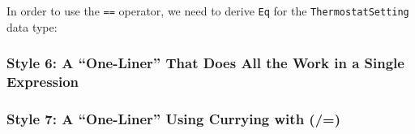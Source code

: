 In order to use the \texttt{==} operator, we need to derive \texttt{Eq}
for the \texttt{ThermostatSetting} data type:

\begin{Shaded}
\begin{Highlighting}[]
  
\OtherTok{=}  
    \OperatorTok{|}  
    \OperatorTok{|} 
    \NormalTok{ (}\NormalTok{, }\NormalTok{)}

  \OtherTok{{-}\textgreater{}} 
\OtherTok{=} 
  \OperatorTok{==} 
   
   
\end{Highlighting}
\end{Shaded}

\hypertarget{style-6-a-one-liner-that-does-all-the-work-in-a-single-expression}{%
\subsubsection{Style 6: A ``One-Liner'' That Does All the Work in a
Single
Expression}\label{style-6-a-one-liner-that-does-all-the-work-in-a-single-expression}}

\begin{Shaded}
\begin{Highlighting}[]
  \OtherTok{{-}\textgreater{}} 

\OtherTok{=}\OperatorTok{/=} \NormalTok{)}
\end{Highlighting}
\end{Shaded}

\hypertarget{style-7-a-one-liner-using-currying-with}{%
\subsubsection{Style 7: A ``One-Liner'' Using Currying with
(/=)}\label{style-7-a-one-liner-using-currying-with}}

\begin{Shaded}
\begin{Highlighting}[]
  \OtherTok{{-}\textgreater{}} 

\OtherTok{=}\NormalTok{ ((}\OperatorTok{/=}\NormalTok{) }\NormalTok{)}
\end{Highlighting}
\end{Shaded}

